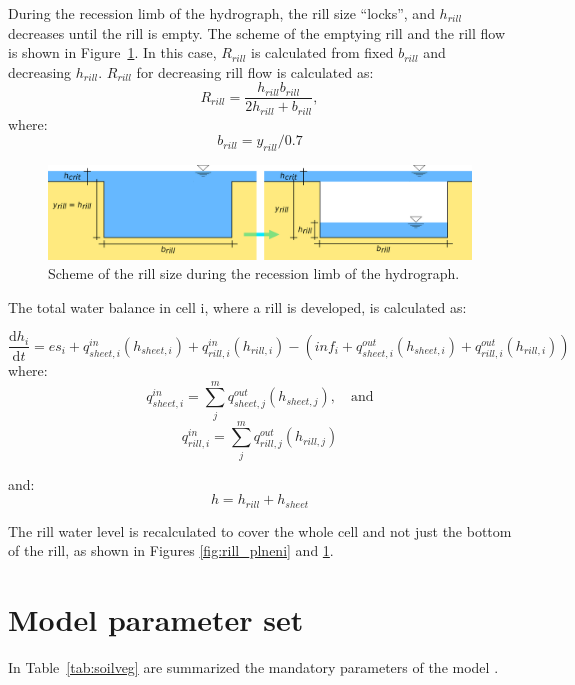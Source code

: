 During the recession limb of the hydrograph, the rill size “locks”, and
$h_{rill}$ decreases until the rill is empty. The scheme of the emptying rill
and the rill flow is shown in Figure~\ref{fig:rill_prazdneni}. In this case,
$R_{rill}$ is calculated from fixed $b_{rill}$ and decreasing $h_{rill}$.
$R_{rill}$ for decreasing rill flow is calculated as:
\begin{equation}
    R_{rill} = \frac{h_{rill}b_{rill}}{2h_{rill}+b_{rill}},
  \label{eq:rrill2}
\end{equation}
where:
\begin{equation}
  b_{rill} = y_{rill}/0.7
  \label{eq:brill2}
\end{equation}

\begin{figure}[t]
    \includegraphics[width=1\linewidth]{./img/rill_schema_prazdneni.png}
    \caption{Scheme of the rill size during the recession limb of the hydrograph.}
    \label{fig:rill_prazdneni}
\end{figure}

The total water balance in cell i, where a rill is developed, is calculated as:

\begin{equation}
    \frac{\mathrm{d}h_i}{\mathrm{d}t} = es_i + q^{in}_{sheet,i}(h_{sheet,i})
    +q^{in}_{rill,i}(h_{rill,i}) - (inf_i + q^{out}_{sheet,i}(h_{sheet,i}) +
    q^{out}_{rill,i}(h_{rill,i}))
\end{equation}
where:
\begin{equation}
    q^{in}_{sheet,i} = \sum_j^m q^{out}_{sheet, j}(h_{sheet,j}),\quad \mathrm{and}
\end{equation}
\begin{equation}
    q^{in}_{rill,i} = \sum_j^m q^{out}_{rill, j}(h_{rill,j})
\end{equation}

and:
\begin{equation}
   h = h_{rill} + h_{sheet}  
\end{equation}

The rill water level is recalculated to cover the whole cell and not just the
bottom of the rill, as shown in Figures \ref{fig:rill_plneni} and
\ref{fig:rill_prazdneni}.


\section{Model parameter set}
In Table~\ref{tab:soilveg} are summarized the mandatory parameters of the model \smod.

%
%

%
